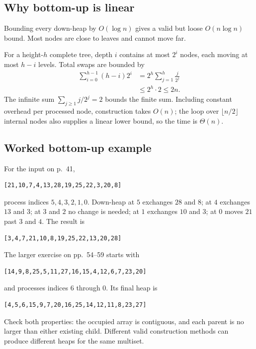 \documentclass[11pt]{article}
\begin{document}
\subsection{Why bottom-up is linear}
Bounding every down-heap by $O(\log n)$ gives a valid but loose $O(n\log n)$ bound. Most nodes are close to leaves and cannot move far.

For a height-$h$ complete tree, depth $i$ contains at most $2^i$ nodes, each moving at most $h-i$ levels. Total swaps are bounded by
\begin{align*}
\sum_{i=0}^{h-1}(h-i)2^i
&=2^h\sum_{j=1}^h\frac{j}{2^j}\\
&\le 2^h\cdot2\le2n.
\end{align*}
The infinite sum $\sum_{j\ge1}j/2^j=2$ bounds the finite sum. Including constant overhead per processed node, construction takes $O(n)$; the loop over $\lfloor n/2\rfloor$ internal nodes also supplies a linear lower bound, so the time is $\Theta(n)$.

\subsection{Worked bottom-up example}
For the input on p.\ 41,
\begin{lstlisting}
[21,10,7,4,13,28,19,25,22,3,20,8]
\end{lstlisting}
process indices $5,4,3,2,1,0$. Down-heap at $5$ exchanges $28$ and $8$; at $4$ exchanges $13$ and $3$; at $3$ and $2$ no change is needed; at $1$ exchanges $10$ and $3$; at $0$ moves $21$ past $3$ and $4$. The result is
\begin{lstlisting}
[3,4,7,21,10,8,19,25,22,13,20,28]
\end{lstlisting}

The larger exercise on pp.\ 54--59 starts with
\begin{lstlisting}
[14,9,8,25,5,11,27,16,15,4,12,6,7,23,20]
\end{lstlisting}
and processes indices $6$ through $0$. Its final heap is
\begin{lstlisting}
[4,5,6,15,9,7,20,16,25,14,12,11,8,23,27]
\end{lstlisting}
Check both properties: the occupied array is contiguous, and each parent is no larger than either existing child. Different valid construction methods can produce different heaps for the same multiset.
\end{document}
